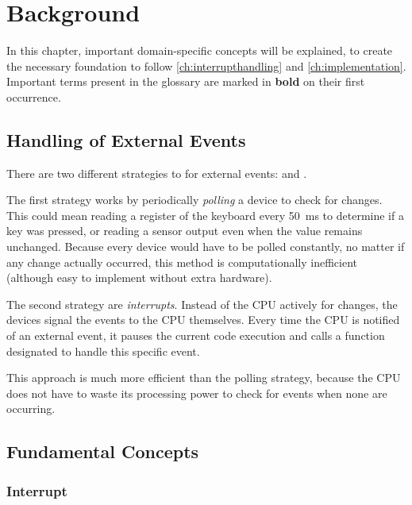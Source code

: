 \chapter{Background}
\label{ch:background}

In this chapter, important domain-specific concepts will be explained, to create the necessary foundation to follow \autoref{ch:interrupthandling} and \autoref{ch:implementation}.
Important terms present in the glossary are marked in \textbf{bold} on their first occurrence.

\clearpage

\section{Handling of External Events}
\label{sec:eventhandling}

There are two different strategies to  for external events:  and .

The first strategy works by periodically \textit{polling} a device to check for changes.
This could mean reading a register of the keyboard every \SI{50}{\milli\second} to determine if a key was pressed, or reading a sensor output even when the value remains unchanged.
Because every device would have to be polled constantly, no matter if any change actually occurred, this method is computationally inefficient (although easy to implement without extra hardware).

The second strategy are \textit{interrupts}.
Instead of the CPU actively  for changes, the devices signal the events to the CPU themselves.
Every time the CPU is notified of an external event, it pauses the current code execution and calls a function designated to handle this specific event.

This approach is much more efficient than the polling strategy, because the CPU does not have to waste its processing power to check for events when none are occurring.

\section{Fundamental Concepts}
\label{sec:fundamentals}

\subsection{Interrupt}
\label{subsec:interrupt}

